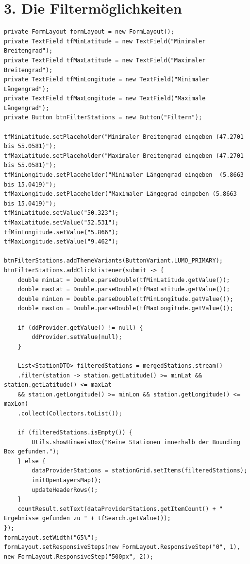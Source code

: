 \documentclass[a4paper,12pt]{scrreprt}
\begin{document}
\section*{\small \textbf{3. Die Filtermöglichkeiten}}
\begin{lstlisting}
private FormLayout formLayout = new FormLayout();
private TextField tfMinLatitude = new TextField("Minimaler Breitengrad");
private TextField tfMaxLatitude = new TextField("Maximaler Breitengrad");
private TextField tfMinLongitude = new TextField("Minimaler Längengrad");
private TextField tfMaxLongitude = new TextField("Maximale Längengrad");
private Button btnFilterStations = new Button("Filtern");

tfMinLatitude.setPlaceholder("Minimaler Breitengrad eingeben (47.2701 bis 55.0581)");
tfMaxLatitude.setPlaceholder("Maximaler Breitengrad eingeben (47.2701 bis 55.0581)");
tfMinLongitude.setPlaceholder("Minimaler Längengrad eingeben  (5.8663 bis 15.0419)");
tfMaxLongitude.setPlaceholder("Maximaler Längegrad eingeben (5.8663 bis 15.0419)");
tfMinLatitude.setValue("50.323");
tfMaxLatitude.setValue("52.531");
tfMinLongitude.setValue("5.866");
tfMaxLongitude.setValue("9.462");

btnFilterStations.addThemeVariants(ButtonVariant.LUMO_PRIMARY);
btnFilterStations.addClickListener(submit -> {
	double minLat = Double.parseDouble(tfMinLatitude.getValue());
	double maxLat = Double.parseDouble(tfMaxLatitude.getValue());
	double minLon = Double.parseDouble(tfMinLongitude.getValue());
	double maxLon = Double.parseDouble(tfMaxLongitude.getValue());
	
	if (ddProvider.getValue() != null) {
		ddProvider.setValue(null);
	}
	
	List<StationDTO> filteredStations = mergedStations.stream()
	.filter(station -> station.getLatitude() >= minLat && station.getLatitude() <= maxLat
	&& station.getLongitude() >= minLon && station.getLongitude() <= maxLon)
	.collect(Collectors.toList());
	
	if (filteredStations.isEmpty()) {
		Utils.showHinweisBox("Keine Stationen innerhalb der Bounding Box gefunden.");
	} else {
		dataProviderStations = stationGrid.setItems(filteredStations);
		initOpenLayersMap();
		updateHeaderRows();
	}
	countResult.setText(dataProviderStations.getItemCount() + " Ergebnisse gefunden zu " + tfSearch.getValue());
});
formLayout.setWidth("65%");
formLayout.setResponsiveSteps(new FormLayout.ResponsiveStep("0", 1), 
new FormLayout.ResponsiveStep("500px", 2));
\end{lstlisting}
\end{document}
